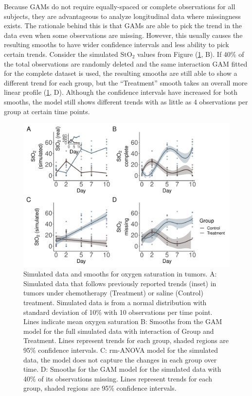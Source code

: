 \documentclass[
]{article}
\begin{document}
Because GAMs do not require equally-spaced or complete observations for all subjects, they are advantageous to analyze longitudinal data where missingness exists. The rationale behind this is that GAMs are able to pick the trend in the data even when some observations are missing. However, this usually causes the resulting smooths to have wider confidence intervals and less ability to pick certain trends. Consider the simulated \(\mbox{StO}_2\) values from Figure (\ref{fig:sim-smooth-plot}, B). If 40\% of the total observations are randomly deleted and the same interaction GAM fitted for the complete dataset is used, the resulting smooths are still able to show a different trend for each group, but the ``Treatment'' smooth takes an overall more linear profile (\ref{fig:sim-smooth-plot}, D). Although the confidence intervals have increased for both smooths, the model still shows different trends with as little as 4 observations per group at certain time points.



\begin{figure}[H]

{\centering \includegraphics[width=0.75\linewidth,]{Full_document_files/figure-latex/sim-smooth-plot-1} 

}

\caption{Simulated data and smooths for oxygen saturation in tumors. A: Simulated data that follows previously reported trends (inset) in tumors under chemotherapy (Treatment) or saline (Control) treatment. Simulated data is from a normal distribution with standard deviation of 10\% with 10 observations per time point. Lines indicate mean oxygen saturation B: Smooths from the GAM model for the full simulated data with interaction of Group and Treatment. Lines represent trends for each group, shaded regions are 95\% confidence intervals. C: rm-ANOVA model for the simulated data, the model does not capture the changes in each group over time. D: Smooths for the GAM model for the simulated data with 40\% of its observations missing. Lines represent trends for each group, shaded regions are 95\% confidence intervals.}\label{fig:sim-smooth-plot}
\end{figure}
\end{document}

